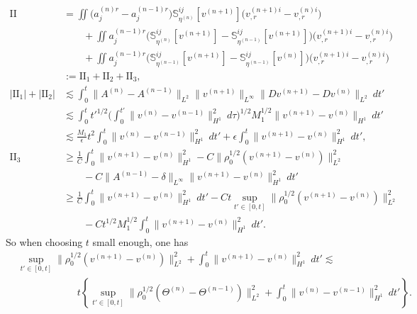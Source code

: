 \documentclass[12pt,a4paper]{amsart}
\numberwithin{equation}{section}
\theoremstyle{plain}
\theoremstyle{definition}
\begin{document}
\begin{align*}
\mathrm{II}&=\iint \Big( a^{(n)r}_j-a^{(n-1)r}_j\Big)\mathbb{S}^{ij}_{\eta^{(n)}}[v^{(n+1)}]\Big(v^{(n+1)i}_{,r}-v^{(n)i}_{,r}\Big) \\
&\qquad+\iint a^{(n-1)r}_j\Big(\mathbb{S}^{ij}_{\eta^{(n)}}[v^{(n+1)}]-\mathbb{S}^{ij}_{\eta^{(n-1)}}[v^{(n+1)}]\Big)\Big(v^{(n+1)i}_{,r}-v^{(n)i}_{,r}\Big) \\
&\qquad+\iint a^{(n-1)r}_j\Big(\mathbb{S}^{ij}_{\eta^{(n-1)}}[v^{(n+1)}]-\mathbb{S}^{ij}_{\eta^{(n-1)}}[v^{(n)}]\Big)\Big(v^{(n+1)i}_{,r}-v^{(n)i}_{,r}\Big)\\
&:=\mathrm{II}_1+\mathrm{II}_2+\mathrm{II}_3,\\
|\mathrm{II}_1|+|\mathrm{II}_2|&\lesssim \int_{0}^{t} \|A^{(n)}-A^{(n-1)}\|_{L^2}\|v^{(n+1)}\|_{L^{\infty}}\|Dv^{(n+1)}-Dv^{(n)}\|_{L^{2}} \ dt'\\
&\lesssim \int_{0}^{t} t'^{1/2} \Big(\int_{0}^{t'} \|v^{(n)}-v^{(n-1)}\|_{H^1}^2\ d\tau \Big)^{1/2} M_1^{1/2}\|v^{(n+1)}-v^{(n)}\|_{H^1} \ dt'\\
&\lesssim \frac{M_1}{\epsilon}t^2 \int_{0}^{t} \|v^{(n)}-v^{(n-1)}\|_{H^1}^2 \ dt' +\epsilon\int_{0}^{t} \|v^{(n+1)}-v^{(n)}\|_{H^1}^2 \ dt',\\
\mathrm{II}_3&\geq \frac{1}{C}\int_{0}^{t} \|v^{(n+1)}-v^{(n)}\|_{H^1}^2-C\|\rho_{0}^{1/2}(v^{(n+1)}-v^{(n)})\|_{L^{2}}^2\\
&\qquad-C\|A^{(n-1)}-\delta\|_{L^{\infty}}\|v^{(n+1)}-v^{(n)}\|_{H^1}^2 \ dt' \\
&\geq \frac{1}{C}\int_{0}^{t} \|v^{(n+1)}-v^{(n)}\|_{H^1}^2\ dt'-Ct\sup\limits_{t'\in[0,t]}\|\rho_{0}^{1/2}(v^{(n+1)}-v^{(n)})\|_{L^{2}}^2\\
&\qquad-C t^{1/2}M_1^{1/2}\int_{0}^{t}\|v^{(n+1)}-v^{(n)}\|_{H^1}^2 \ dt'.
\end{align*}
So when choosing $t$ small enough, one has
\begin{equation}\label{contraction1}
\begin{aligned}
&\sup\limits_{t'\in[0,t]}\|\rho_{0}^{1/2}(v^{(n+1)}-v^{(n)})\|_{L^{2}}^2+\int_{0}^{t} \|v^{(n+1)}-v^{(n)}\|_{H^1}^2\ dt'\lesssim\\
&\qquad\qquad\qquad t\left\{\sup\limits_{t'\in[0,t]}\|\rho_{0}^{1/2}(\Theta^{(n)}-\Theta^{(n-1)})\|_{L^{2}}^2+\int_{0}^{t} \|v^{(n)}-v^{(n-1)}\|_{H^1}^2\ dt'\right\}.
\end{aligned}
\end{equation}
\end{document}
